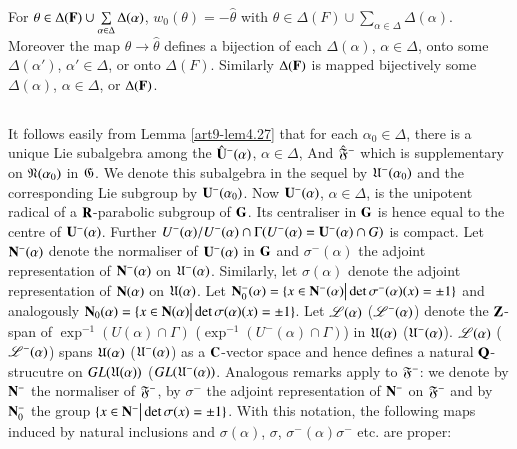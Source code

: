 \begin{lemma}\label{art9-lem4.27}
For $\theta \in \Delta (\mathbf{F}) \cup \sum\limits_{\alpha \in \Delta} \Delta (\alpha)$, $w_0(\theta) = - \hat{\theta}$ with $\theta \in \Delta (F) \cup \sum\limits_{\alpha \in \Delta} \Delta (\alpha)$. Moreover the map $\theta \to \hat{\theta}$ defines a bijection of each $\Delta (\alpha)$, $\alpha \in \Delta$, onto some $\Delta (\alpha')$, $\alpha' \in \Delta$, or onto $\Delta (F)$. Similarly $\Delta(\mathbf{F})$ is mapped bijectively some $\Delta (\alpha)$, $\alpha \in \Delta$, or $\Delta (\mathbf{F})$.
 \end{lemma}

\subsection{}\label{art9-subsec4.28}
It follows easily from Lemma \ref{art9-lem4.27} that for each $\alpha_0 \in \Delta$, there is a unique Lie subalgebra among the $\hat{\mathbf{U}}^- (\alpha)$, $\alpha \in \Delta$, And $\hat{\mathfrak{F}}^-$ which is supplementary on $\mathfrak{N} (\alpha_0)$ in $\mathfrak{G}$. We denote this subalgebra in the sequel by $\mathfrak{U}^-(\alpha_0)$ and the corresponding Lie subgroup by $\mathbf{U}^-(\alpha_0)$. Now $\mathbf{U}^-(\alpha)$, $\alpha \in\Delta$, is the unipotent radical of a $\mathbf{R}$-parabolic subgroup of $\mathbf{G}$. Its centraliser in $\mathbf{G}$ is hence equal to the centre of $\mathbf{U}^-(\alpha)$. Further $U^-(\alpha)/ U^- (\alpha) \cap \Gamma (U^-(\alpha) = \mathbf{U}^-(\alpha) \cap G)$ is compact. Let $\mathbf{N}^-(\alpha)$ denote the normaliser of $\mathbf{U}^-(\alpha)$ in $\mathbf{G}$ and $\sigma^-(\alpha)$ the adjoint representation of $\mathbf{N}^-(\alpha)$ on $\mathfrak{U}^-(\alpha)$. Similarly, let $\sigma (\alpha)$ denote the adjoint representation of $\mathbf{N} (\alpha)$ on $\mathfrak{U}(\alpha)$. Let $\mathbf{N}^-_0 (\alpha) = \{x \in \mathbf{N}^-(\alpha) \big| \det \sigma^-(\alpha) (x) = \pm 1\}$ and analogously $\mathbf{N}_0 (\alpha) = \{x \in \mathbf{N} (\alpha) \big| \det \sigma (\alpha) (x) = \pm 1\}$. Let $\mathscr{L}(\alpha)$ (\resp $\mathscr{L}^-(\alpha)$) denote the $\mathbf{Z}$-span of $\exp^{-1} (U (\alpha) \cap \Gamma)$ (\resp $\exp^{-1} (U^- (\alpha) \cap \Gamma)$) in $\mathfrak{U}(\alpha)$ (\resp $\mathfrak{U}^-(\alpha)$). $\mathscr{L}(\alpha)$ (\resp $\mathscr{L}^-(\alpha)$) spans $\mathfrak{U}(\alpha)$ (\resp $\mathfrak{U}^-(\alpha)$) as a $\mathbf{C}$-vector space and hence defines a natural $\mathbf{Q}$-strucutre  on $GL (\mathfrak{U}(\alpha))$ (\resp $GL(\mathfrak{U}^-(\alpha))$. Analogous remarks apply to $\mathfrak{F}^-$: we denote by $\mathbf{N}^-$ the normaliser of $\mathfrak{F}^-$, by $\sigma^-$ the adjoint representation of $\mathbf{N}^-$ on $\mathfrak{F}^-$ and by $\mathbf{N}^-_0$ the group $\{x \in \mathbf{N}^-\big| \det \sigma (x) = \pm 1\}$. With this notation, the following maps induced by natural inclusions and $\sigma (\alpha)$, $\sigma$, $\sigma^-(\alpha) \sigma^-$  etc. are proper:
